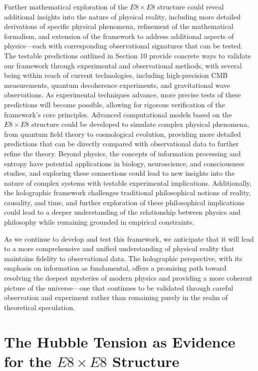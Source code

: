 \documentclass[11pt,english,twoside]{article}
\begin{document}
Further mathematical exploration of the $E8\times E8$ structure could reveal additional insights into the nature of physical reality, including more detailed derivations of specific physical phenomena, refinement of the mathematical formalism, and extension of the framework to address additional aspects of physics—each with corresponding observational signatures that can be tested. The testable predictions outlined in Section 10 provide concrete ways to validate our framework through experimental and observational methods, with several being within reach of current technologies, including high-precision CMB measurements, quantum decoherence experiments, and gravitational wave observations. As experimental techniques advance, more precise tests of these predictions will become possible, allowing for rigorous verification of the framework's core principles. Advanced computational models based on the $E8\times E8$ structure could be developed to simulate complex physical phenomena, from quantum field theory to cosmological evolution, providing more detailed predictions that can be directly compared with observational data to further refine the theory. Beyond physics, the concepts of information processing and entropy have potential applications in biology, neuroscience, and consciousness studies, and exploring these connections could lead to new insights into the nature of complex systems with testable experimental implications. Additionally, the holographic framework challenges traditional philosophical notions of reality, causality, and time, and further exploration of these philosophical implications could lead to a deeper understanding of the relationship between physics and philosophy while remaining grounded in empirical constraints.

As we continue to develop and test this framework, we anticipate that it will lead to a more comprehensive and unified understanding of physical reality that maintains fidelity to observational data. The holographic perspective, with its emphasis on information as fundamental, offers a promising path toward resolving the deepest mysteries of modern physics and providing a more coherent picture of the universe—one that continues to be validated through careful observation and experiment rather than remaining purely in the realm of theoretical speculation.

\section{The Hubble Tension as Evidence for the $E8\times E8$ Structure}
\end{document}
